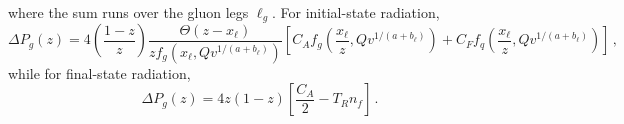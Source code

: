 where the sum runs over the gluon legs $\ell_g$. For initial-state
radiation,
\begin{equation}
\label{eq:DPg-ISR}
\Delta P_g(z) =
4\left(\frac{1-z}{z}\right)\frac{\Theta(z-x_\ell)}{z f_g(x_\ell,Q v^{1/(a+b_\ell)})}
\left[C_A f_g\left(\frac{x_\ell}z,Q v^{1/(a+b_\ell)}\right) + C_F f_q\left(\frac{x_\ell}z,Q v^{1/(a+b_\ell)}\right)\right]\,,
\end{equation}
while for final-state radiation,
\begin{equation}
\label{eq:DPg-FSR}
\Delta P_g(z) =4z(1-z)\left[\frac{C_A}{2}-T_Rn_f\right]\,.
\end{equation}